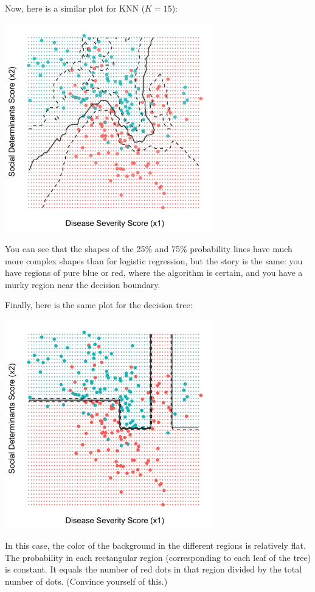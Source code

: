 \noindent Now, here is a similar plot for KNN ($K=15$): 
\begin{center}
\includegraphics[width=0.68\textwidth]{img/esl-knn-15-prob.png}
\end{center}

You can see that the shapes of the 25\% and 75\% probability lines have much more complex shapes than for logistic regression, but the story is the same: you have regions of pure blue or red, where the algorithm is certain, and you have a murky region near the decision boundary. 

Finally, here is the same plot for the decision tree:
\begin{center}
\includegraphics[width=0.68\textwidth]{img/esl-decision-tree-prob.png}
\end{center}
In this case, the color of the background in the different regions is relatively flat. The probability in each rectangular region (corresponding to each leaf of the tree) is constant. It equals the number of red dots in that region divided by the total number of dots. (Convince yourself of this.) 

